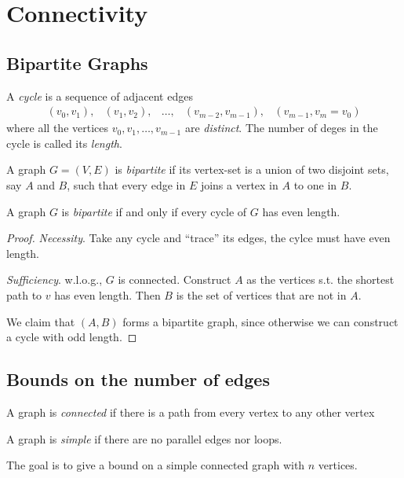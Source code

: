 \chapter{Connectivity}
\section{Bipartite Graphs}
\begin{definition}[Cycle]
A \emph{cycle} is a sequence of adjacent edges
\[
\begin{array}{lllll}
(v_0,v_1),
&
(v_1,v_2),
&
\dots,
&
(v_{m-2},v_{m-1}),
&
(v_{m-1},v_m=v_0)
\end{array}
\]
where all the vertices $v_0,v_1,\dots,v_{m-1}$ are \emph{distinct}.
The number of deges in the cycle is called its \emph{length}.
\end{definition}

\begin{definition}[Bipartite]
A graph $G=(V,E)$ is \emph{bipartite} if its vertex-set is a union of two disjoint sets, say $A$ and $B$,
such that every edge in $E$ joins a vertex in $A$ to one in $B$.
\end{definition}

\begin{theorem}
A graph $G$ is \emph{bipartite} if and only if every cycle of $G$ has even length.
\end{theorem}
\begin{proof}
\textit{Necessity}.
Take any cycle and ``trace'' its edges, the cylce must have even length.

\textit{Sufficiency}.
w.l.o.g., $G$ is connected.
Construct $A$ as the vertices s.t. the shortest path to $v$ has even length. Then $B$ is the set of vertices that are not in $A$.

We claim that $(A,B)$ forms a bipartite graph, since otherwise we can construct a cycle with odd length.
\end{proof}

\section{Bounds on the number of edges}

\begin{definition}[Connected]
A graph is \emph{connected} if there is a path from every vertex to any other vertex
\end{definition}
\begin{definition}[Simple]
A graph is \emph{simple} if there are no parallel edges nor loops.
\end{definition}
The goal is to give a bound on a simple connected graph with $n$ vertices.


